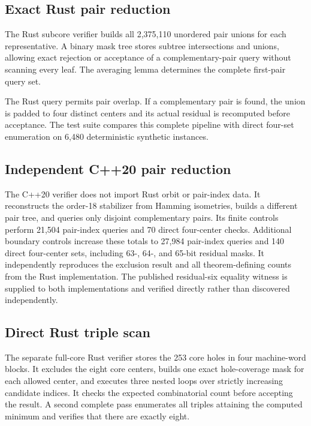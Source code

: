\documentclass[11pt]{article}
\begin{document}
\subsection{Exact Rust pair reduction}

The Rust subcore verifier builds all 2,375,110 unordered pair unions for
each representative.  A binary mask tree stores subtree intersections and
unions, allowing exact rejection or acceptance of a complementary-pair
query without scanning every leaf.  The averaging lemma determines the
complete first-pair query set.

The Rust query permits pair overlap.  If a complementary pair is found,
the union is padded to four distinct centers and its actual residual is
recomputed before acceptance.  The test suite compares this complete
pipeline with direct four-set enumeration on 6,480 deterministic synthetic
instances.

\subsection{Independent C++20 pair reduction}

The C++20 verifier does not import Rust orbit or pair-index data.  It
reconstructs the order-18 stabilizer from Hamming isometries, builds a
different pair tree, and queries only disjoint complementary pairs.  Its
finite controls perform 21,504 pair-index queries and 70 direct four-center
checks.  Additional boundary controls increase these totals to 27,984
pair-index queries and 140 direct four-center sets, including 63-, 64-, and
65-bit residual masks.  It independently reproduces the exclusion result
and all theorem-defining counts from the Rust implementation.  The published
residual-six equality witness is supplied to both implementations and
verified directly rather than discovered independently.

\subsection{Direct Rust triple scan}

The separate full-core Rust verifier stores the 253 core holes in four
machine-word blocks.
It excludes the eight core centers, builds one exact hole-coverage mask
for each allowed center, and executes three nested loops over strictly
increasing candidate indices.  It checks the expected combinatorial
count before accepting the result.  A second complete pass enumerates
all triples attaining the computed minimum and verifies that there are
exactly eight.
\end{document}
